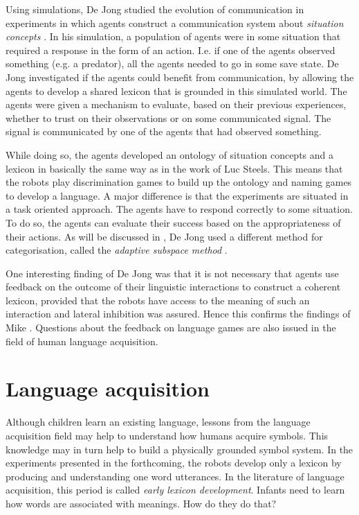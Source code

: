 Using simulations, De Jong studied  the evolution of communication in experiments in which agents construct a communication system about {\em situation concepts} \citep{dejong:99b}. In his simulation, a population of agents were in some situation that required a response in the form of an action. I.e.  if one of the agents observed something (e.g. a predator), all the agents needed to go in some save state. De Jong investigated if the agents could benefit from communication, by allowing the agents to develop a shared lexicon that is grounded in this simulated world. The agents were given a mechanism to evaluate, based on their previous experiences, whether to trust on their observations or on some communicated signal. The signal is communicated by one of the agents that had observed something.

While doing so, the agents developed an ontology of situation concepts and a lexicon in basically the same way as in the work of Luc Steels. This means that the robots play discrimination games to build up the ontology and naming games to develop a language. A major difference is that the experiments are situated in a task oriented approach. The agents have to respond correctly to some situation. To do so, the agents can evaluate their success based on the appropriateness of their actions. As will be discussed in , De Jong used a different method for categorisation, called the {\em adaptive subspace method} \citep{dejongvogt:1998}.

One interesting finding of De Jong was that it is not necessary that agents use feedback on the outcome of their linguistic interactions to construct a coherent lexicon, provided that the robots have access to the meaning of such an interaction and lateral inhibition was assured. Hence this confirms the findings of Mike \citet{oliphant:1998}. Questions about the feedback on language games are also issued in the field of human language acquisition.


\section{Language acquisition}\label{s:intro:acquisition}

Although children learn an existing language, lessons from the language acquisition field may help to understand how humans acquire symbols. This knowledge may in turn help to build a physically grounded symbol system. In the experiments presented in the forthcoming, the robots develop only a lexicon by producing and understanding one word utterances. In the literature of language acquisition, this period is called {\em early lexicon development}. Infants need to learn how words are associated with meanings. How do they do that?

